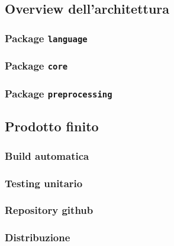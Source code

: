 \subsection{Overview dell'architettura}
\subsubsection{Package \texttt{language}}
\subsubsection{Package \texttt{core}}
\subsubsection{Package \texttt{preprocessing}}

\subsection{Prodotto finito}
\subsubsection{Build automatica}
\subsubsection{Testing unitario}
\subsubsection{Repository github}
\subsubsection{Distribuzione}